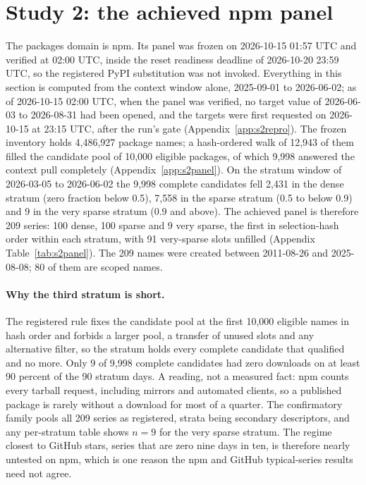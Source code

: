 \providecommand{\qs}{QScore9}

\section{Study 2: the achieved npm panel}
\label{sec:s2panel}

The packages domain is npm. Its panel was frozen on 2026-10-15 01:57 UTC and verified at 02:00 UTC, inside
the reset readiness deadline of 2026-10-20 23:59 UTC, so the registered PyPI substitution was not invoked.
Everything in this section is computed from the context window alone, 2025-09-01 to 2026-06-02; as of
2026-10-15 02:00 UTC, when the panel was verified, no target value of 2026-06-03 to 2026-08-31 had been
opened, and the targets were first requested on 2026-10-15 at 23:15 UTC, after the run's gate
(Appendix~\ref{app:s2repro}). The frozen inventory holds 4,486,927 package names; a hash-ordered walk of
12,943 of them filled the candidate pool of 10,000 eligible packages, of which 9,998 answered the context
pull completely (Appendix~\ref{app:s2panel}). On the stratum window of 2026-03-05 to 2026-06-02 the 9,998
complete candidates fell 2,431 in the dense stratum (zero fraction below 0.5), 7,558 in the sparse stratum
(0.5 to below 0.9) and 9 in the very sparse stratum (0.9 and above). The achieved panel is therefore 209
series: 100 dense, 100 sparse and 9 very sparse, the first in selection-hash order within each stratum, with
91 very-sparse slots unfilled (Appendix Table~\ref{tab:s2panel}). The 209 names were created between
2011-08-26 and 2025-08-08; 80 of them are scoped names.

\paragraph{Why the third stratum is short.} The registered rule fixes the candidate pool at the first
10,000 eligible names in hash order and forbids a larger pool, a transfer of unused slots and any
alternative filter, so the stratum holds every complete candidate that qualified and no more. Only 9 of
9,998 complete candidates had zero downloads on at least 90 percent of the 90 stratum days. A reading, not a
measured fact: npm counts every tarball request, including mirrors and automated clients, so a published
package is rarely without a download for most of a quarter. The confirmatory family pools all 209 series as
registered, strata being secondary descriptors, and any per-stratum table shows $n = 9$ for the very sparse
stratum. The regime closest to GitHub stars, series that are zero nine days in ten, is therefore nearly
untested on npm, which is one reason the npm and GitHub typical-series results need not agree.

